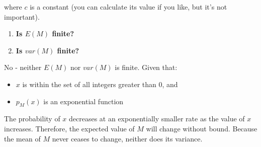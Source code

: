 \documentclass[12pt,a4paper]{article}
\numberwithin{equation}{subsection}
\begin{document}
\begin{enumerate}
where $c$ is a constant (you can calculate its value if you like, but it's not important).

\begin{enumerate}
\item \textbf{Is $E(M)$ finite?}
\item \textbf{Is $var(M)$ finite?}
\end{enumerate}

No - neither $E(M)$ nor $var(M)$ is finite.  Given that:
\begin{itemize}
    \item $x$ is within the set of all integers greater than 0, and
    \item $p_M(x)$ is an exponential function
\end{itemize}
The probability of $x$ decreases at an exponentially smaller rate as the value of $x$ increases.  Therefore, the expected value of $M$ will change without bound.  Because the mean of $M$ never ceases to change, neither does its variance.
\end{enumerate}
\end{document}
